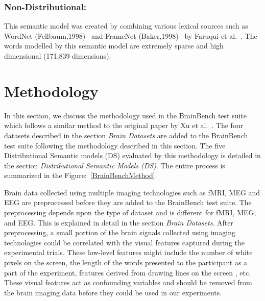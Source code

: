 \subsubsection{Non-Distributional:} This semantic model was created
by combining various lexical sources such as
WordNet (Fellbaum,1998)~\cite{wordnet} and FrameNet (Baker,1998)~\cite{FrameNet} by Faruqui et al.~\cite{NonDist}. The words modelled by this semantic model are extremely
sparse and high dimensional (171,839 dimensions). 

\section{Methodology}
\label{brainbenchmethod}
In this section, we discuss the methodology used in the BrainBench test suite which follows a similar method to the original paper by Xu et al.~\cite{BrainBench2016}. The four datasets described in the section \textit{Brain Datasets} are added to the BrainBench test suite following the methodology described in this section. The five Distributional Semantic models (DS) evaluated by this methodology is detailed in the section \textit{Distributional Semantic Models (DS)}. The entire process is summarized in the Figure:~\ref{BrainBenchMethod}.

Brain data collected using multiple imaging technologies such as fMRI, MEG and EEG are preprocessed before they are added to the BrainBench test suite. The preprocessing depends upon the type of dataset and is different for fMRI, MEG, and EEG. This is explained in detail in the section \textit{Brain Datasets}. After preprocessing, a small portion of the brain signals collected using imaging technologies could be correlated with the visual features captured during the experimental trials. These low-level features might include the number of white pixels on the screen, the length of the words presented to the participant as a part of the experiment, features derived from drawing lines on the screen \cite{SUDRE2012451}, etc. These visual features act as confounding variables and should be removed from the brain imaging data before they could be used in our experiments.

